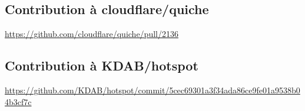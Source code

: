 \appendix

\subsection{Contribution à cloudflare/quiche}\label{cloudflare-pr}

\url{https://github.com/cloudflare/quiche/pull/2136}

\subsection{Contribution à KDAB/hotspot}\label{hotspot-fix-commit}

\url{https://github.com/KDAB/hotspot/commit/5cec69301a3f34ada86ce9fe01a9538b04b3cf7c}
